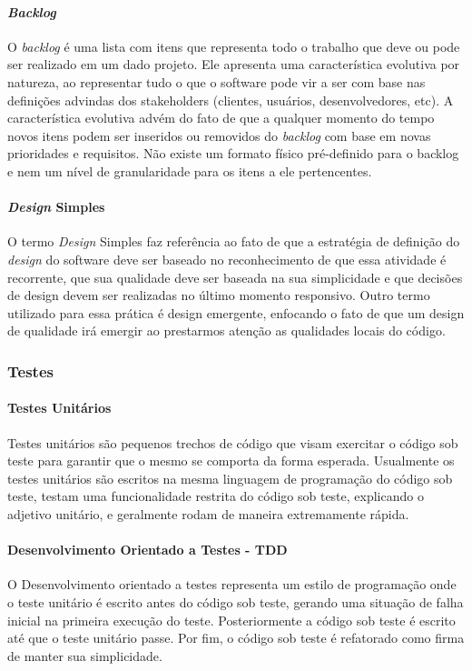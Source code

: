 \documentclass[
	article,			%
	11pt,				%
	oneside,			%
	a4paper,			%
	english,			%
	brazil,				%
	sumario=tradicional
	]{abntex2}
\begin{document}
\paragraph*{\emph{Backlog}}
O \emph{backlog} é uma lista com itens que representa todo o trabalho que deve ou pode ser realizado em um dado projeto. Ele apresenta uma característica evolutiva por natureza, ao representar tudo o que o software pode vir a ser com base nas definições advindas dos stakeholders (clientes, usuários, desenvolvedores, etc). A característica evolutiva advém do fato de que a qualquer momento do tempo novos itens podem ser inseridos ou removidos do \emph{backlog} com base em novas prioridades e requisitos. Não existe um formato físico pré-definido para o backlog e nem um nível de granularidade para os itens a ele pertencentes.

\paragraph*{\emph{Design} Simples}
O termo \emph{Design} Simples faz referência ao fato de que a estratégia de definição do \emph{design} do software deve ser baseado no reconhecimento de que essa atividade é recorrente, que sua qualidade deve ser baseada na sua simplicidade e que decisões de design devem ser realizadas no último momento responsivo. Outro termo utilizado para essa prática é design emergente, enfocando o fato de que um design de qualidade irá emergir ao prestarmos atenção as qualidades locais do código.

\subsubsection*{Testes}

\paragraph*{Testes Unitários}
Testes unitários são pequenos trechos de código que visam exercitar o código sob teste para garantir que o mesmo se comporta da forma esperada. Usualmente os testes unitários são escritos na mesma linguagem de programação do código sob teste, testam uma funcionalidade restrita do código sob teste, explicando o adjetivo unitário, e geralmente rodam de maneira extremamente rápida.

\paragraph*{Desenvolvimento Orientado a Testes - TDD}
O Desenvolvimento orientado a testes representa um estilo de programação onde o teste unitário é escrito antes do código sob teste, gerando uma situação de falha inicial na primeira execução do teste. Posteriormente a código sob teste é escrito até que o teste unitário passe. Por fim, o código sob teste é refatorado como firma de manter sua simplicidade.
\end{document}
